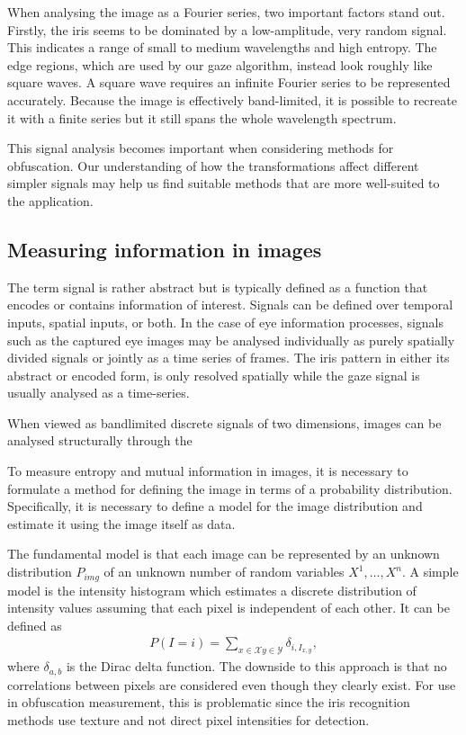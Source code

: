 When analysing the image as a Fourier series, two important factors stand out. Firstly, the iris seems to be dominated by a low-amplitude, very random signal. This indicates a range of small to medium wavelengths and high entropy. The edge regions, which are used by our gaze algorithm, instead look roughly like square waves. A square wave requires an infinite Fourier series to be represented accurately. Because the image is effectively band-limited, it is possible to recreate it with a finite series but it still spans the whole wavelength spectrum.

This signal analysis becomes important when considering methods for obfuscation. Our understanding of how the transformations affect different simpler signals may help us find suitable methods that are more well-suited to the application.

\subsection{Measuring information in images}
The term signal is rather abstract but is typically defined as a function that encodes or contains information of interest. Signals can be defined over temporal inputs, spatial inputs, or both. In the case of eye information processes, signals such as the captured eye images may be analysed individually as purely spatially divided signals or jointly as a time series of frames. The iris pattern in either its abstract or encoded form, is only resolved spatially while the gaze signal is usually analysed as a time-series. 




When viewed as bandlimited discrete signals of two dimensions, images can be analysed structurally through the 

To measure entropy and mutual information in images, it is necessary to formulate a method for defining the image in terms of a probability distribution. Specifically, it is necessary to define a model for the image distribution and estimate it using the image itself as data.

The fundamental model is that each image can be represented by an unknown distribution $P_{img}$ of an unknown number of random variables $X^1, \dots, X^n$. A simple model is the intensity histogram which estimates a discrete distribution of intensity values assuming that each pixel is independent of each other. It can be defined as
\begin{align}
    P(I=i) = \sum_{x\in\mathcal{X}y\in\mathcal{Y}} \delta_{i, I_{x,y}},
\end{align}
where $\delta_{a, b}$ is the Dirac delta function. The downside to this approach is that no correlations between pixels are considered even though they clearly exist. For use in obfuscation measurement, this is problematic since the iris recognition methods use texture and not direct pixel intensities for detection. 

